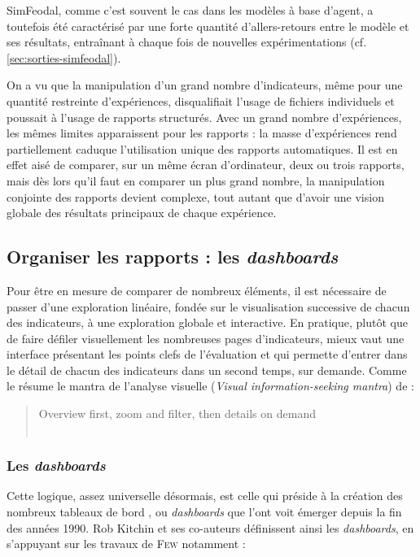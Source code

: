SimFeodal, comme c'est souvent le cas dans les modèles à base d'agent, a toutefois été caractérisé par une forte quantité d'allers-retours entre le modèle et ses résultats, entraînant à chaque fois de nouvelles expérimentations (cf. \cref{sec:sorties-simfeodal}). 

On a vu que la manipulation d'un grand nombre d'indicateurs, même pour une quantité restreinte d'expériences, disqualifiait l'usage de fichiers individuels et poussait à l'usage de rapports structurés.
Avec un grand nombre d'expériences, les mêmes limites apparaissent pour les rapports : la masse d'expériences rend partiellement caduque l'utilisation unique des rapports automatiques.
Il est en effet aisé de comparer, sur un même écran d'ordinateur, deux ou trois rapports, mais dès lors qu'il faut en comparer un plus grand nombre, la manipulation conjointe des rapports devient complexe, tout autant que d'avoir une vision globale des résultats principaux de chaque expérience.

\subsection{Organiser les rapports : les \textit{dashboards}}\label{subsec:dashboards}

Pour être en mesure de comparer de nombreux éléments, il est nécessaire de passer d'une exploration linéaire, fondée sur le visualisation successive de chacun des indicateurs, à une exploration globale et interactive.
En pratique, plutôt que de faire défiler visuellement les nombreuses pages d'indicateurs, mieux vaut une interface présentant les points clefs de l'évaluation et qui permette d'entrer dans le détail de chacun des indicateurs dans un second temps, sur demande.
Comme le résume le \og mantra\fg{} de l'analyse visuelle (\og \textit{Visual information-seeking mantra}\fg{}) de  :
\begin{quote}
	\centering
	\noindent\og Overview first, zoom and filter, then details on demand\fg{}\\
	\mbox{}~ \hfill \cite[\ppno~2]{shneiderman1996eyes}
\end{quote}


\subsubsection{Les \textit{dashboards}}

Cette logique, assez universelle désormais, est celle qui préside à la création des nombreux \og tableaux de bord \fg{}, ou \og \textit{dashboards} \fg{} que l'ont voit émerger depuis la fin des années 1990.
Rob Kitchin et ses co-auteurs définissent ainsi les \textit{dashboards}, en s'appuyant sur les travaux de \textsc{Few} notamment :

